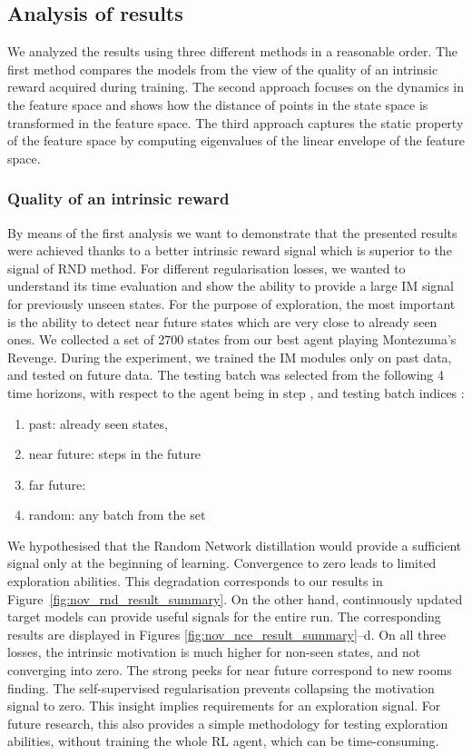 \documentclass[a4paper,11pt]{elsarticle}
\begin{document}
\subsection{Analysis of results}

We analyzed the results using three different methods in a reasonable order. 
The first method compares the models from the view of the quality of an intrinsic reward acquired during training. The second approach focuses on the dynamics in the feature space and shows how the distance of points in the state space is transformed in the feature space. The third approach captures the static property of the feature space by computing eigenvalues of the linear envelope of the feature space.

\subsubsection{Quality of an intrinsic reward}

By means of the first analysis we want to demonstrate that the presented results were achieved thanks to a better intrinsic reward signal which is superior to the signal of RND method. For different regularisation losses, we wanted to understand its time evaluation and show the ability to provide a large IM signal for previously unseen states. For the purpose of exploration, the most important is the ability to detect near future states which are very close to already seen ones. We collected a set of 2700 states from our best agent playing Montezuma's Revenge. During the experiment, we trained the IM modules only on past data, and tested on future data. The testing batch was selected from the following 4 time horizons, with respect to the agent being in step , and testing batch indices :
\begin{enumerate}
    \item past: already seen states, 
    \item near future:  steps in the future
    \item far future: 
    \item random: any batch from the set
\end{enumerate}

We hypothesised that the Random Network distillation would provide a sufficient signal only at the beginning of learning. Convergence to zero leads to limited exploration abilities. This degradation corresponds to our results in Figure~\ref{fig:nov_rnd_result_summary}.
On the other hand, continuously updated target models can provide useful signals for the entire run. The corresponding results are displayed in Figures \ref{fig:nov_nce_result_summary}--d. On all three losses, the intrinsic motivation is much higher for non-seen states, and not converging into zero. The strong peeks for near future correspond to new rooms finding. The self-supervised regularisation prevents collapsing the motivation signal to zero. 
This insight implies  requirements for an exploration signal.
For future research, this also provides a simple methodology for testing exploration abilities, without training the whole RL agent, which can be time-consuming. 
\end{document}
